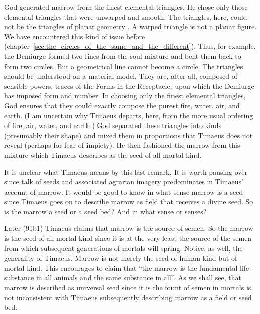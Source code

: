 God generated marrow from the finest elemental triangles. He chose only those elemental triangles that were unwarped and smooth. The triangles, here, could not be the triangles of planar geometry \citep[293 n2]{Cornford:1935fk}. A warped triangle is not a planar figure. We have encountered this kind of issue before (chapter~\ref{sec:the_circles_of_the_same_and_the_different}). Thus, for example, the Demiurge formed two lines from the soul mixture and bent them back to form two circles. But a geometrical line cannot become a circle. The triangles should be understood on a material model. They are, after all, composed of sensible powers, traces of the Forms in the Receptacle, upon which the Demiurge has imposed form and number. In choosing only the finest elemental triangles, God ensures that they could exactly compose the purest fire, water, air, and earth. (I am uncertain why Timaeus departs, here, from the more usual ordering of fire, air, water, and earth.) God separated these triangles into kinds (presumably their shape) and mixed them in proportions that Timaeus does not reveal (perhaps for fear of impiety). He then fashioned the marrow from this mixture which Timaeus describes as the seed of all mortal kind. 

It is unclear what Timaeus means by this last remark. It is worth pausing over since talk of seeds and associated agrarian imagery predominates in Timaeus' account of marrow. It would be good to know in what sense marrow is a seed since Timaeus goes on to describe marrow as field that receives a divine seed. So is the marrow a seed or a seed bed? And in what sense or senses?

Later (91b1) Timaeus claims that marrow is the source of semen. So the marrow is the seed of all mortal kind since it is at the very least the source of the semen from which subsequent generations of mortals will spring. Notice, as well, the generality of Timaeus. Marrow is not merely the seed of human kind \citep[73]{Waterfield:2008lx} but of mortal kind. This encourages \citet[295]{Cornford:1935fk} to claim that ``the marrow is the fundamental life-substance in all animals and the same substance in all''. As we shall see, that marrow is described as universal seed since it is the fount of semen in mortals is not inconsistent with Timaeus subsequently describing marrow as a field or seed bed.


